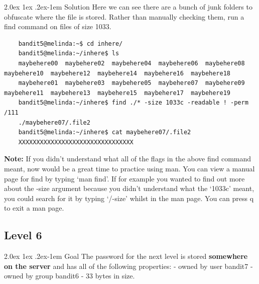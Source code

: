 \documentclass[11pt]{article}
\makeatletter
\renewcommand{\paragraph}{%
  \@startsection{paragraph}{4}%
  {\z@}{2.0ex \@plus 1ex \@minus .2ex}{-1em}%
  {\normalfont\normalsize\bfseries}%
}
\makeatother
\begin{document}
\paragraph{Solution}
Here we can see there are a bunch of junk folders to obfuscate where the file is stored. Rather than manually checking them, run a find command on files of size 1033.
\begin{lstlisting}
	bandit5@melinda:~$ cd inhere/
	bandit5@melinda:~/inhere$ ls                         
	maybehere00  maybehere02  maybehere04  maybehere06  maybehere08  maybehere10  maybehere12  maybehere14  maybehere16  maybehere18
	maybehere01  maybehere03  maybehere05  maybehere07  maybehere09  maybehere11  maybehere13  maybehere15  maybehere17  maybehere19
	bandit5@melinda:~/inhere$ find ./* -size 1033c -readable ! -perm /111
	./maybehere07/.file2
	bandit5@melinda:~/inhere$ cat maybehere07/.file2
	XXXXXXXXXXXXXXXXXXXXXXXXXXXXXXXX
\end{lstlisting}
\textbf{Note:} If you didn't understand what all of the flags in the above find command meant, now would be a great time to practice using man. You can view a manual page for find by typing `man find'. If for example you wanted to find out more about the -size argument because you didn't understand what the `1033c' meant, you could search for it by typing `/-size' whilst in the man page. You can press q to exit a man page.

\subsection{Level 6}
\paragraph{Goal}
The password for the next level is stored \textbf{somewhere on the server} and has all of the following properties: - owned by user bandit7 - owned by group bandit6 - 33 bytes in size.
\end{document}
